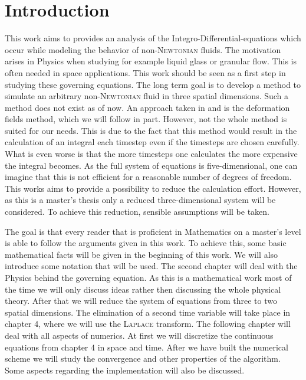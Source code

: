 \documentclass[12pt,a4paper,twoside, open=right]{scrreprt}
\theoremstyle{definition}
\theoremstyle{plain}
\begin{document}
\chapter{Introduction}
This work aims to provides an analysis of the Integro-Differential-equations which occur while modeling the behavior of non-\textsc{Newtonian} fluids. The motivation arises in Physics when studying for example liquid glass or granular flow. This is often needed in space applications. This work should be seen as a first step in studying these governing equations. The long term goal is to develop a method to simulate an arbitrary non-\textsc{Newtonian} fluid in three spatial dimensions. Such a method does not exist as of now. An approach taken in \cite{Hulsen2001} and \cite{Hulsen2018} is the deformation fields method, which we will follow in part. However, not the whole method is suited for our needs. This is due to the fact that this method would result in the calculation of an integral each timestep even if the timesteps are chosen carefully. What is even worse is that the more timesteps one calculates the more expensive the integral becomes. As the full system of equations is five-dimensional, one can imagine that this is not efficient for a reasonable number of degrees of freedom. This works aims to provide a possibility to reduce the calculation effort. However, as this is a master's thesis only a reduced three-dimensional system will be considered. To achieve this reduction, sensible assumptions will be taken.
\\
\par 
The goal is that every reader that is proficient in Mathematics on a master's level is able to follow the arguments given in this work. To achieve this, some basic mathematical facts will be given in the beginning of this work. We will also introduce some notation that will be used. The second chapter will deal with the Physics behind the governing equation. As this is a mathematical work most of the time we will only discuss ideas rather then discussing the whole physical theory. After that we will reduce the system of equations from three to two spatial dimensions. The elimination of a second time variable will take place in chapter 4, where we will use the \textsc{Laplace} transform. The following chapter will deal with all aspects of numerics. At first we will discretize the continuous equations from chapter 4 in space and time. After we have built the numerical scheme we will study the convergence and other properties of the algorithm. Some aspects regarding the implementation will also be discussed.\\
\end{document}
